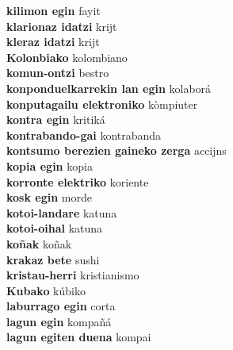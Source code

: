 \textbf{ kilimon egin  } fayit \\
\textbf{ klarionaz idatzi  } krijt \\
\textbf{ kleraz idatzi  } krijt \\
\textbf{ Kolonbiako  } kolombiano \\
\textbf{ komun-ontzi  } bestro \\
\textbf{ konponduelkarrekin lan egin  } kolaborá \\
\textbf{ konputagailu elektroniko  } kòmpiuter \\
\textbf{ kontra egin  } kritiká \\
\textbf{ kontrabando-gai  } kontrabanda \\
\textbf{ kontsumo berezien gaineko zerga  } accijns \\
\textbf{ kopia egin  } kopia \\
\textbf{ korronte elektriko  } koriente \\
\textbf{ kosk egin  } morde \\
\textbf{ kotoi-landare  } katuna \\
\textbf{ kotoi-oihal  } katuna \\
\textbf{ koñak  } koñak \\
\textbf{ krakaz bete  } sushi \\
\textbf{ kristau-herri  } kristianismo \\
\textbf{ Kubako  } kúbiko \\
\textbf{ laburrago egin  } corta \\
\textbf{ lagun egin  } kompañá \\
\textbf{ lagun egiten duena  } kompai \\
